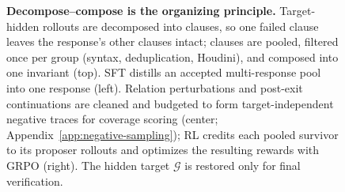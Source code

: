 \begin{figure}[t]
{
}%
\caption{\textbf{Decompose--compose is the organizing principle.}
Target-hidden rollouts are decomposed into clauses, so one failed clause
leaves the response's other clauses intact; clauses are pooled, filtered once
per group (syntax, deduplication, Houdini), and composed into one invariant
(top).  SFT distills an accepted multi-response pool into one response
(left).  Relation perturbations and post-exit continuations are cleaned and
budgeted to form target-independent negative traces for coverage scoring
(center; Appendix~\ref{app:negative-sampling}); RL credits each pooled survivor to
its proposer rollouts and optimizes the resulting rewards with GRPO (right).
The hidden target \(\mathcal G\) is restored only for final verification.}
\label{fig:overview}
\end{figure}
